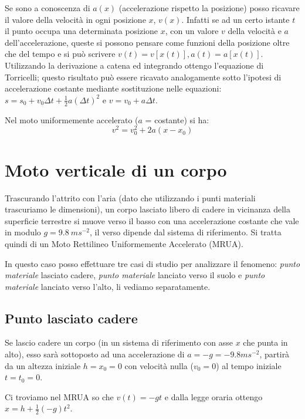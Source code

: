 \documentclass[class=book, crop=false, oneside, 12pt]{standalone}
\begin{document}
Se sono a conoscenza di \(a(x)\) (accelerazione rispetto la posizione)
posso ricavare il valore della velocità in ogni posizione \(x\),
\(v(x)\). Infatti se ad un certo istante \(t\) il punto occupa una
determinata posizione \(x\), con un valore \(v\) della velocità e \(a\)
dell'accelerazione, queste si possono pensare come funzioni della
posizione oltre che del tempo e si può scrivere
\(v(t) = v[x(t)], a(t)=a[x (t)]\). Utilizzando la derivazione a catena
ed integrando ottengo l'equazione di Torricelli; questo risultato può
essere ricavato analogamente sotto l'ipotesi di accelerazione costante
mediante sostituzione nelle equazioni:
\(s = s_0 + v_0\Delta t + \frac {1}{2} a(\Delta t)^2\) e
\(v = v_0 + a\Delta t\).

Nel moto uniformemente accelerato (\(a\) = costante) si ha:
\begin{equation}
  v^2 = v_0^2 +2a (x-x_0)
\end{equation}


\section{Moto verticale di un corpo }

Trascurando l'attrito con l'aria (dato che utilizzando i punti materiali
trascuriamo le dimensioni), un corpo lasciato libero di cadere in
vicinanza della superficie terrestre si muove verso il basso con una
accelerazione costante che vale in modulo \(g = 9.8 \ ms^{-2}\), il
verso dipende dal sistema di riferimento. Si tratta quindi di un Moto
Rettilineo Uniformemente Accelerato (MRUA).

In questo caso posso effettuare tre casi di studio per analizzare il
fenomeno: \emph{punto materiale} lasciato cadere, \emph{punto materiale} lanciato
verso il suolo e \emph{punto materiale} lanciato verso l'alto, li vediamo
separatamente.

\subsection{Punto lasciato cadere}

Se lascio cadere un corpo (in un sistema di riferimento con asse \(x\)
che punta in alto), esso sarà sottoposto ad una accelerazione di
\(a = -g = -9.8 ms^{-2}\), partirà da un altezza iniziale
\(h = x_0 = 0\) con velocità nulla (\(v_0 = 0\)) al tempo iniziale
\(t = t_0  = 0\).

Ci troviamo nel MRUA so che \(v(t) = -gt\) e dalla legge oraria ottengo
\(x = h + \frac {1} {2} (-g)t^2\).
\end{document}

